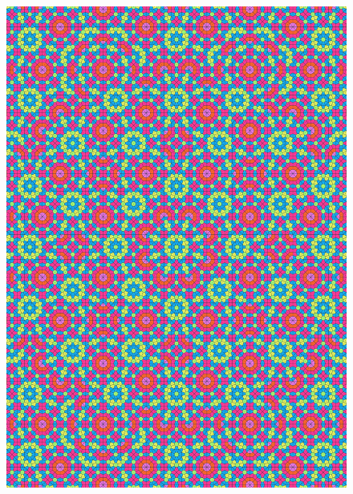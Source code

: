 \documentclass[text.tex]{subfiles}
\begin{document}
\begin{figure}[h!]
\centering
\includegraphics[width=1\textwidth]{img/results/octagon/quasi_polygon-octagon_150000_(3_0alpha_2).pdf}
\end{figure}
\end{document}
